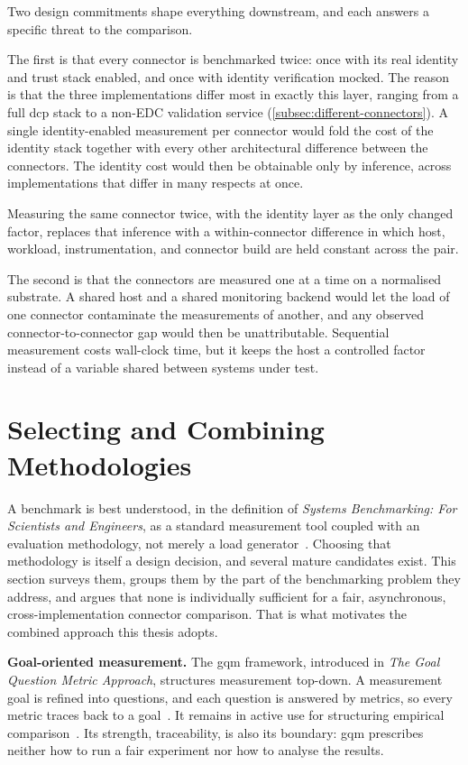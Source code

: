 Two design commitments shape everything downstream, and each answers a specific threat to the comparison.

The first is that every connector is benchmarked twice: once with its real identity and trust stack enabled, and once with identity verification mocked. The reason is that the three implementations differ most in exactly this layer, ranging from a full \gls{dcp} stack to a non-EDC validation service (\cref{subsec:different-connectors}). A single identity-enabled measurement per connector would fold the cost of the identity stack together with every other architectural difference between the connectors. The identity cost would then be obtainable only by inference, across implementations that differ in many respects at once.

Measuring the same connector twice, with the identity layer as the only changed factor, replaces that inference with a within-connector difference in which host, workload, instrumentation, and connector build are held constant across the pair.

The second is that the connectors are measured one at a time on a normalised substrate. A shared host and a shared monitoring backend would let the load of one connector contaminate the measurements of another, and any observed connector-to-connector gap would then be unattributable. Sequential measurement costs wall-clock time, but it keeps the host a controlled factor instead of a variable shared between systems under test.


\section{Selecting and Combining Methodologies}\label{sec:comparing-benchmarks}

A benchmark is best understood, in the definition of \emph{Systems Benchmarking: For Scientists and Engineers}, as a standard measurement tool coupled with an evaluation methodology, not merely a load generator~\citep{kounev2020systems}. Choosing that methodology is itself a design decision, and several mature candidates exist. This section surveys them, groups them by the part of the benchmarking problem they address, and argues that none is individually sufficient for a fair, asynchronous, cross-implementation connector comparison. That is what motivates the combined approach this thesis adopts.

\textbf{Goal-oriented measurement.} The \gls{gqm} framework, introduced in \emph{The Goal Question Metric Approach}, structures measurement top-down. A measurement goal is refined into questions, and each question is answered by metrics, so every metric traces back to a goal~\citep{caldiera1994goal}. It remains in active use for structuring empirical comparison~\citep{minhas2023gqm}. Its strength, traceability, is also its boundary: \gls{gqm} prescribes neither how to run a fair experiment nor how to analyse the results.

